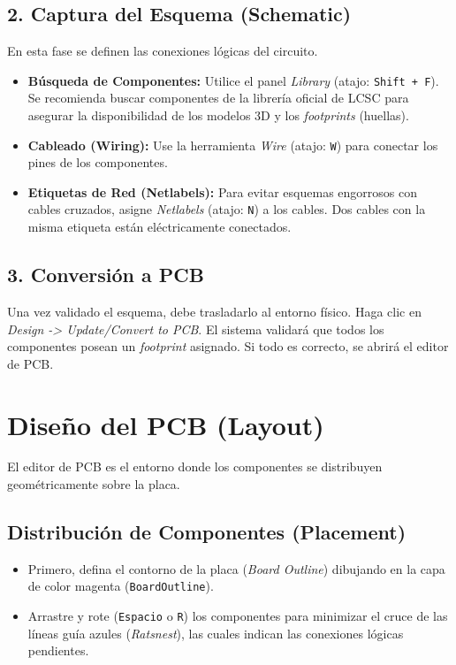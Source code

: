 \documentclass[12pt,a4paper]{article}
\begin{document}
\subsection{2. Captura del Esquema (Schematic)}
En esta fase se definen las conexiones lógicas del circuito.
\begin{itemize}
    \item \textbf{Búsqueda de Componentes:} Utilice el panel \textit{Library} (atajo: \texttt{Shift + F}). Se recomienda buscar componentes de la librería oficial de LCSC para asegurar la disponibilidad de los modelos 3D y los \textit{footprints} (huellas).
    \item \textbf{Cableado (Wiring):} Use la herramienta \textit{Wire} (atajo: \texttt{W}) para conectar los pines de los componentes.
    \item \textbf{Etiquetas de Red (Netlabels):} Para evitar esquemas engorrosos con cables cruzados, asigne \textit{Netlabels} (atajo: \texttt{N}) a los cables. Dos cables con la misma etiqueta están eléctricamente conectados.
\end{itemize}

\subsection{3. Conversión a PCB}
Una vez validado el esquema, debe trasladarlo al entorno físico. 
Haga clic en \textit{Design -> Update/Convert to PCB}. El sistema validará que todos los componentes posean un \textit{footprint} asignado. Si todo es correcto, se abrirá el editor de PCB.

\section{Diseño del PCB (Layout)}

El editor de PCB es el entorno donde los componentes se distribuyen geométricamente sobre la placa.

\subsection{Distribución de Componentes (Placement)}
\begin{itemize}
    \item Primero, defina el contorno de la placa (\textit{Board Outline}) dibujando en la capa de color magenta (\texttt{BoardOutline}).
    \item Arrastre y rote (\texttt{Espacio} o \texttt{R}) los componentes para minimizar el cruce de las líneas guía azules (\textit{Ratsnest}), las cuales indican las conexiones lógicas pendientes.
\end{itemize}
\end{document}
